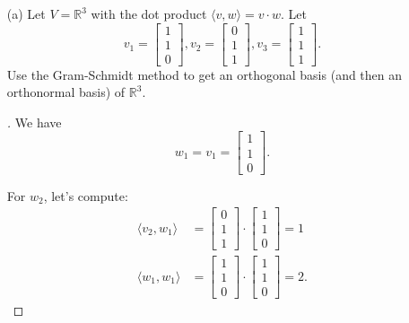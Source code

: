 \documentclass[11pt]{article}
\begin{document}
    \begin{enumerate}
        \item[(a)] Let \(V = \mathbb{R}^3\) with the dot product \(\langle v,w \rangle = v \cdot w\). Let \[v_1 = \begin{bmatrix}
            1 \\ 1 \\ 0
        \end{bmatrix}, v_2 = \begin{bmatrix}
            0 \\ 1 \\ 1
        \end{bmatrix}, v_3 = \begin{bmatrix}
            1 \\ 1 \\ 1
        \end{bmatrix}.\] Use the Gram-Schmidt method to get an orthogonal basis (and then an orthonormal basis) of \(\mathbb{R}^3\). 
        
        \begin{proof}[\unskip\nopunct]
            We have \[w_1 = v_1 = \begin{bmatrix}
                1 \\ 1 \\0
            \end{bmatrix}. \]

            For \(w_2\), let's compute: 
            \begin{align*}
                \langle v_2, w_1 \rangle &= \begin{bmatrix}
                    0 \\ 1 \\ 1
                \end{bmatrix} \cdot \begin{bmatrix}
                    1 \\ 1 \\ 0
                \end{bmatrix} = 1 \\
                \langle w_1, w_1 \rangle &= \begin{bmatrix}
                    1 \\ 1 \\ 0 
                \end{bmatrix} \cdot \begin{bmatrix}
                    1 \\ 1 \\ 0
                \end{bmatrix} = 2.
            \end{align*}


\end{proof}
\end{enumerate}
\end{document}
